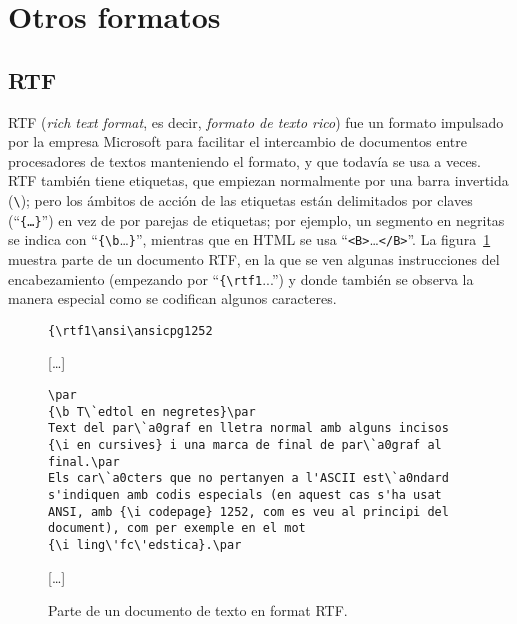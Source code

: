 \section{Otros formatos} \subsection{RTF} \label{s3:RTF} 

RTF (\emph{rich text format}, es decir, \emph{formato de texto rico}) fue un formato impulsado por la empresa Microsoft para facilitar el intercambio de documentos entre procesadores de textos manteniendo el formato, y que todavía se usa a veces. RTF también tiene etiquetas, que empiezan normalmente por una barra invertida (\texttt{\textbackslash}); pero los ámbitos de acción de las etiquetas están delimitados por claves (``\texttt{\{\ldots\}}'') en vez de por parejas de etiquetas; por ejemplo, un segmento en negritas se indica con ``\verb+{\b+\ldots\verb+}+'', mientras que en HTML se usa ``\verb+<B>+\ldots\verb+</B>+''. La figura~\ref{fg:RTF} muestra parte de un documento RTF, en la que se ven algunas instrucciones del encabezamiento (empezando por ``\verb+{\rtf1+...'') y donde también se observa la manera especial como se codifican algunos caracteres. 

\begin{figure}
\begin{center}
\begin{verbatim}
{\rtf1\ansi\ansicpg1252
\end{verbatim}
[\ldots]
\begin{verbatim}
\par
{\b T\`edtol en negretes}\par
Text del par\`a0graf en lletra normal amb alguns incisos 
{\i en cursives} i una marca de final de par\`a0graf al 
final.\par  
Els car\`a0cters que no pertanyen a l'ASCII est\`a0ndard 
s'indiquen amb codis especials (en aquest cas s'ha usat 
ANSI, amb {\i codepage} 1252, com es veu al principi del 
document), com per exemple en el mot 
{\i ling\'fc\'edstica}.\par
\end{verbatim}
[\ldots]
\end{center}
\caption{Parte de un documento de texto en format RTF.} \label{fg:RTF} \end{figure} 

